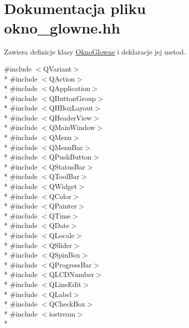\hypertarget{okno__glowne_8hh}{\section{Dokumentacja pliku okno\-\_\-glowne.\-hh}
\label{okno__glowne_8hh}
}


Zawiera definicje klasy \hyperlink{class_okno_glowne}{Okno\-Glowne} i deklaracje jej metod.  


{\ttfamily \#include $<$Q\-Variant$>$}\\*
{\ttfamily \#include $<$Q\-Action$>$}\\*
{\ttfamily \#include $<$Q\-Application$>$}\\*
{\ttfamily \#include $<$Q\-Button\-Group$>$}\\*
{\ttfamily \#include $<$Q\-H\-Box\-Layout$>$}\\*
{\ttfamily \#include $<$Q\-Header\-View$>$}\\*
{\ttfamily \#include $<$Q\-Main\-Window$>$}\\*
{\ttfamily \#include $<$Q\-Menu$>$}\\*
{\ttfamily \#include $<$Q\-Menu\-Bar$>$}\\*
{\ttfamily \#include $<$Q\-Push\-Button$>$}\\*
{\ttfamily \#include $<$Q\-Status\-Bar$>$}\\*
{\ttfamily \#include $<$Q\-Tool\-Bar$>$}\\*
{\ttfamily \#include $<$Q\-Widget$>$}\\*
{\ttfamily \#include $<$Q\-Color$>$}\\*
{\ttfamily \#include $<$Q\-Painter$>$}\\*
{\ttfamily \#include $<$Q\-Time$>$}\\*
{\ttfamily \#include $<$Q\-Date$>$}\\*
{\ttfamily \#include $<$Q\-Locale$>$}\\*
{\ttfamily \#include $<$Q\-Slider$>$}\\*
{\ttfamily \#include $<$Q\-Spin\-Box$>$}\\*
{\ttfamily \#include $<$Q\-Progress\-Bar$>$}\\*
{\ttfamily \#include $<$Q\-L\-C\-D\-Number$>$}\\*
{\ttfamily \#include $<$Q\-Line\-Edit$>$}\\*
{\ttfamily \#include $<$Q\-Label$>$}\\*
{\ttfamily \#include $<$Q\-Check\-Box$>$}\\*
{\ttfamily \#include $<$iostream$>$}\\*
